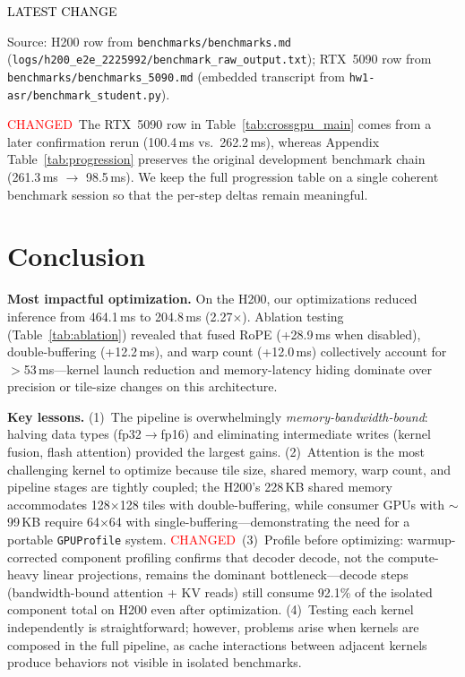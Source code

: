 \documentclass{article}
\newcommand{\chg}[1]{{\color{blue}#1}}
\newcommand{\chglabel}{{\setlength{\fboxsep}{1pt}\colorbox{yellow!45}{\textcolor{red}{\scriptsize CHANGED}}}}
\newcommand{\latestchglabel}{{\setlength{\fboxsep}{1pt}\colorbox{yellow!65}{\textcolor{black}{\scriptsize LATEST CHANGE}}}}
\newcommand{\latestsource}[1]{%
  \par\noindent
  {\footnotesize \latestchglabel\ \parbox[t]{0.9\linewidth}{#1}}\par
}
\begin{document}
\latestsource{Source: H200 row from \texttt{benchmarks/benchmarks.md} (\texttt{logs/h200\_e2e\_2225992/benchmark\_raw\_output.txt}); RTX~5090 row from \texttt{benchmarks/benchmarks\_5090.md} (embedded transcript from \texttt{hw1-asr/benchmark\_student.py}).}

\chglabel\ \chg{The RTX~5090 row in Table~\ref{tab:crossgpu_main} comes from a later confirmation rerun (100.4\,ms vs.\ 262.2\,ms), whereas Appendix Table~\ref{tab:progression} preserves the original development benchmark chain (261.3\,ms $\rightarrow$ 98.5\,ms).  We keep the full progression table on a single coherent benchmark session so that the per-step deltas remain meaningful.}

\section{Conclusion}\label{sec:conclusion}

\textbf{Most impactful optimization.}
On the H200, our optimizations reduced inference from 464.1\,ms to 204.8\,ms (2.27$\times$).
Ablation testing (Table~\ref{tab:ablation}) revealed that fused RoPE (+28.9\,ms when disabled), double-buffering (+12.2\,ms), and warp count (+12.0\,ms) collectively account for $>$53\,ms---kernel launch reduction and memory-latency hiding dominate over precision or tile-size changes on this architecture.

\textbf{Key lessons.}
(1)~The pipeline is overwhelmingly \emph{memory-bandwidth-bound}: halving data types (fp32$\to$fp16) and eliminating intermediate writes (kernel fusion, flash attention) provided the largest gains.
(2)~Attention is the most challenging kernel to optimize because tile size, shared memory, warp count, and pipeline stages are tightly coupled; the H200's 228\,KB shared memory accommodates 128$\times$128 tiles with double-buffering, while consumer GPUs with $\sim$99\,KB require 64$\times$64 with single-buffering---demonstrating the need for a portable \texttt{GPUProfile} system.
\chglabel\ \chg{(3)~Profile before optimizing: warmup-corrected component profiling confirms that decoder decode, not the compute-heavy linear projections, remains the dominant bottleneck---decode steps (bandwidth-bound attention + KV reads) still consume 92.1\% of the isolated component total on H200 even after optimization.}
(4)~Testing each kernel independently is straightforward; however, problems arise when kernels are composed in the full pipeline, as cache interactions between adjacent kernels produce behaviors not visible in isolated benchmarks.
\end{document}
